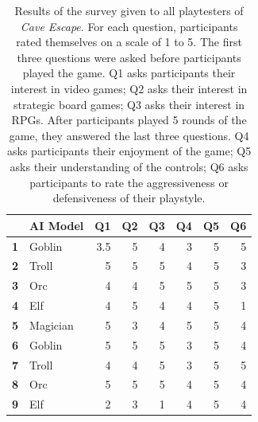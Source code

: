 \begin{table}[htbp]
  \centering
  \caption{Results of the survey given to all playtesters of \textit{Cave Escape}. For each question, participants rated themselves on a scale of 1 to 5. The first three questions were asked before participants played the game. Q1 asks participants their interest in video games; Q2 asks their interest in strategic board games; Q3 asks their interest in RPGs. After participants played 5 rounds of the game, they answered the last three questions. Q4 asks participants their enjoyment of the game; Q5 asks their understanding of the controls; Q6 asks participants to rate the aggressiveness or defensiveness of their playstyle.}
    \begin{tabular}{|rlrrrrrr|}
    \toprule
    \rowcolor[rgb]{ 0,  0,  0} \multicolumn{1}{|l}{\textcolor[rgb]{ 1,  1,  1}{\textbf{Test \#}}} & \textcolor[rgb]{ 1,  1,  1}{\textbf{AI Model}} & \multicolumn{1}{l}{\textcolor[rgb]{ 1,  1,  1}{\textbf{Q1}}} & \multicolumn{1}{l}{\textcolor[rgb]{ 1,  1,  1}{\textbf{Q2}}} & \multicolumn{1}{l}{\textcolor[rgb]{ 1,  1,  1}{\textbf{Q3}}} & \multicolumn{1}{l}{\textcolor[rgb]{ 1,  1,  1}{\textbf{Q4}}} & \multicolumn{1}{l}{\textcolor[rgb]{ 1,  1,  1}{\textbf{Q5}}} & \multicolumn{1}{l|}{\textcolor[rgb]{ 1,  1,  1}{\textbf{Q6}}} \\
    \midrule
    \rowcolor[rgb]{ .851,  .851,  .851} \textbf{1} & Goblin & 3.5   & 5     & 4     & 3     & 5     & 5 \\
    \midrule
    \textbf{2} & Troll & 5     & 5     & 5     & 4     & 5     & 3 \\
    \midrule
    \rowcolor[rgb]{ .851,  .851,  .851} \textbf{3} & Orc   & 4     & 4     & 5     & 5     & 5     & 3 \\
    \midrule
    \textbf{4} & Elf   & 4     & 5     & 4     & 4     & 5     & 1 \\
    \midrule
    \rowcolor[rgb]{ .851,  .851,  .851} \textbf{5} & Magician  & 5     & 3     & 4     & 5     & 5     & 4 \\
    \midrule
    \textbf{6} & Goblin & 5     & 5     & 5     & 3     & 5     & 4 \\
    \midrule
    \rowcolor[rgb]{ .851,  .851,  .851} \textbf{7} & Troll & 4     & 4     & 5     & 3     & 5     & 5 \\
    \midrule
    \textbf{8} & Orc   & 5     & 5     & 5     & 4     & 5     & 4 \\
    \midrule
    \rowcolor[rgb]{ .851,  .851,  .851} \textbf{9} & Elf   & 2     & 3     & 1     & 4     & 5     & 4 \\

\end{tabular}
\end{table}
